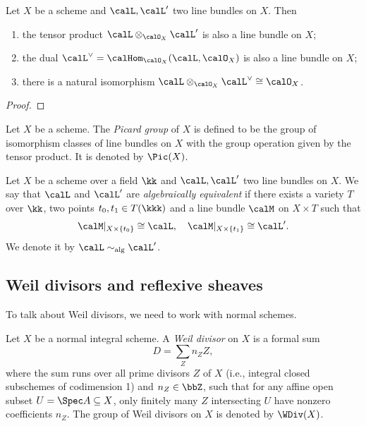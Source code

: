     \begin{proposition}\label{prop:line_bundles_under_tensor_product_and_dual}
        Let \(X\) be a scheme and \(\calL, \calL'\) two line bundles on \(X\).
        Then 
        \begin{enumerate}
            \item the tensor product \(\calL \otimes_{\calO_X} \calL'\) is also a line bundle on \(X\);
            \item the dual \(\calL^\vee = \calHom_{\calO_X}(\calL, \calO_X)\) is also a line bundle on \(X\);
            \item there is a natural isomorphism \(\calL \otimes_{\calO_X} \calL^\vee \cong \calO_X\).
        \end{enumerate}
    \end{proposition}
    \begin{proof}
        
    \end{proof}

    \begin{definition}\label{def:picard_group}
        Let \(X\) be a scheme. 
        The \emph{Picard group} of \(X\) is defined to be the group of isomorphism classes of line bundles on \(X\) with the group operation given by the tensor product.
        It is denoted by \(\Pic(X)\).
    \end{definition}

    \begin{definition}\label{def:algebraically_equivalent_line_bundles}
        Let \(X\) be a scheme over a field \(\kk\) and \(\calL, \calL'\) two line bundles on \(X\).
        We say that \(\calL\) and \(\calL'\) are \emph{algebraically equivalent} if there exists a  variety \(T\) over \(\kk\), two points \(t_0, t_1 \in T(\kkk)\) and a line bundle \(\calM\) on \(X \times T\) such that 
        \[ \calM|_{X \times \{t_0\}} \cong \calL, \quad \calM|_{X \times \{t_1\}} \cong \calL'. \]
        We denote it by \(\calL \sim_{\text{alg}} \calL'\).
    \end{definition}

\subsection{Weil divisors and reflexive sheaves}

    To talk about Weil divisors, we need to work with normal schemes.

    \begin{definition}\label{def:Weil_divisor}
        Let \(X\) be a normal integral scheme.
        A \emph{Weil divisor} on \(X\) is a formal sum 
        \[ D = \sum_{Z} n_Z Z, \]
        where the sum runs over all prime divisors \(Z\) of \(X\) (i.e., integral closed subschemes of codimension 1) and \(n_Z \in \bbZ\), such that for any affine open subset \(U = \Spec A \subseteq X\), only finitely many \(Z\) intersecting \(U\) have nonzero coefficients \(n_Z\).
        The group of Weil divisors on \(X\) is denoted by \(\WDiv(X)\).
    \end{definition}

